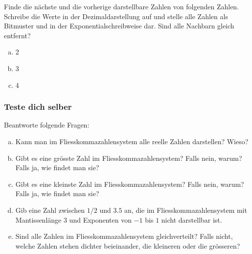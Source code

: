 \begin{aufgabe}\label{nachbarn}
Finde die nächste und die vorherige darstellbare Zahlen von folgenden Zahlen. Schreibe die Werte in der Dezimaldarstellung auf und stelle alle Zahlen als Bitmuster und in der Exponentialschreibweise dar. Sind alle Nachbarn gleich entfernt?
\begin{enumerate}[(a)]
\item 2
\item 3
\item 4
\end{enumerate}
\end{aufgabe}

\subsubsection*{\textcolor{blue-violet}{Teste dich selber}}

\begin{aufgabe}\label{fliesskommazahlen_kontrollfragen}
Beantworte folgende Fragen:
\begin{enumerate}[(a)]
\item Kann man im Fliesskommazahlensystem alle reelle Zahlen darstellen? Wieso?
\item Gibt es eine grösste Zahl im Fliesskommazahlensystem? Falls nein, warum? Falls ja, wie findet man sie?
\item Gibt es eine kleinste Zahl im Fliesskommazahlensystem? Falls nein, warum? Falls ja, wie findet man sie?
\item Gib eine Zahl zwischen \(1/2\) und \(3.5\) an, die im Fliesskommazahlensystem mit Mantissenlänge 3 und Exponenten von \(-1\) bis \(1\) nicht darstellbar ist.
\item Sind alle Zahlen im Fliesskommazahlensystem gleichverteilt? Falls nicht, welche Zahlen stehen dichter beieinander, die kleineren oder die grösseren?
\end{enumerate}
\end{aufgabe}

